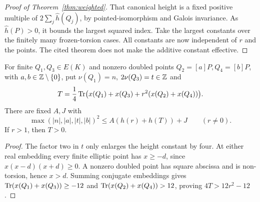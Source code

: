 \documentclass[11pt,a4paper]{article}
\begin{document}
\begin{proof}[Proof of Theorem~\ref{thm:weighted}]
That canonical height is a fixed positive multiple of
$2\sum_j\widehat h(Q_j)$, by pointed-isomorphism and Galois invariance.
As $\widehat h(P)>0$, it bounds the largest squared index. Take the
largest constants over the finitely many frozen-torsion cases. All
constants are now independent of $r$ and the points. The cited theorem
does not make the additive constant effective.
\end{proof}

\begin{corollary}\label{cor:four}
For finite $Q_1,Q_3\in E(K)$ and nonzero doubled points
$Q_2=[a]P,Q_4=[b]P$, with $a,b\in\mathbb Z\setminus\{0\}$, put
$\nu(Q_1)=n$, $2\nu(Q_3)=t\in\mathbb Z$ and
\[
 T=\frac14\operatorname{Tr}\bigl(x(Q_1)+x(Q_3)+r^2(x(Q_2)+x(Q_4))\bigr).
\]
There are fixed $A,J$ with
\[
 \max(|n|,|a|,|t|,|b|)^2\le A(h(r)+h(T))+J\qquad(r\ne0).
\]
If $r>1$, then $T>0$.
\end{corollary}
\begin{proof}
The factor two in $t$ only enlarges the height constant by four.
At either real embedding every finite elliptic point has $x\ge-d$,
since $x(x-d)(x+d)\ge0$. A nonzero doubled point has square abscissa
and is non-torsion, hence $x>d$. Summing conjugate embeddings gives
$\operatorname{Tr}(x(Q_1)+x(Q_3))\ge-12$ and
$\operatorname{Tr}(x(Q_2)+x(Q_4))>12$, proving $4T>12r^2-12$.
\end{proof}
\end{document}
